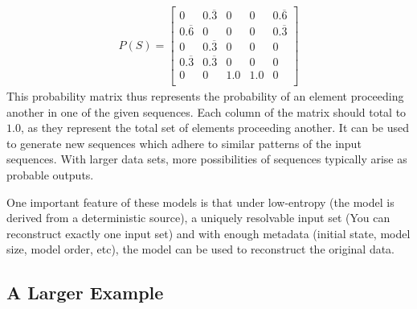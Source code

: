 \begin{align}
P(S) = \left[
\begin{matrix}
0 & 0.\overline{3} & 0 & 0 & 0.\overline{6} \\ 
0.\overline{6} & 0 & 0 & 0 & 0.\overline{3} \\ 
0 & 0.\overline{3} & 0 & 0 & 0 \\ 
0.\overline{3} & 0.\overline{3} & 0 & 0 & 0\\ 
0 & 0 & 1.0 & 1.0 & 0 \\ 
\end{matrix}\right] \label{eqn:Example-prob-matrix-1}
\end{align}
This probability matrix thus represents the probability of an element proceeding another in one of the given sequences. Each column of the matrix should total to $1.0$, as they represent the total set of elements proceeding another. It can be used to generate new sequences which adhere to similar patterns of the input sequences. With larger data sets, more possibilities of sequences typically arise as probable outputs. 

One important feature of these models is that under low-entropy (the model is derived from a deterministic source), a uniquely resolvable input set (You can reconstruct exactly one input set) and with enough metadata (initial state, model size, model order, etc), the model can be used to reconstruct the original data.







\subsection{A Larger Example}

